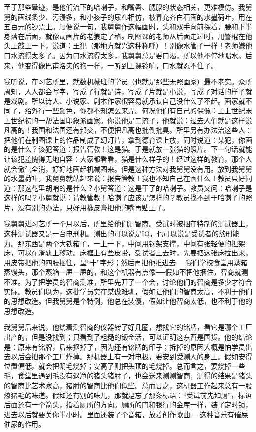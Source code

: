 至于那些晕迹，是他们流下的哈喇子，和嘴唇、腮腺的状态相关，更难模仿。我舅舅的画线条少、污渍多，和小孩子的尿布相仿，被冒充齐白石画的水墨荷叶，用在五百元的钞票上。顺便说一句，我舅舅作这幅画时，头和双手向前探着，腰和下半身落在后面，就像动画片的老狼定了格。制图课的老师从后面走过时，用警棍在他头上敲上一下，说道：王犯（那地方就兴这种称呼）！别像水管子一样！老师嫌他口水流得太多了。因为口水流得太多，我舅舅总是要口渴，所以他不停地喝水。后来，他变得像巴甫洛夫的狗一样，一听到上课铃响，口水就忍不住了。 

我听说，在习艺所里，就数机械班的学员（也就是那些无照画家）最不老实。众所周知，人人都会写字，写成了行就是诗，写成了片就是小说，写成了对话的样子就是戏剧。所以诗人、小说家、剧本作家很容易就承认自己没什么了不起。画家就不同了，给外行一些颜色，你都不知怎么来弄。何况他们有自己的偶像：上上世纪末上世纪初的一帮法国印象派画家。你说他是二流子，他就说：过去人们就是这样说凡高的！我国和法国还有邦交，不便把凡高也批倒批臭。所里另有办法治这些人：把他们在制图课上的作品制成了幻灯片，拿到德育课上放，同时说道：某犯，你画的是什么？该犯答道：报告管教！这是猫。于是就放一张猫的照片。下一句话就能让该犯羞愧得无地自容：大家都看看，猫是什么样子的！经过这样的教育，那个人就会傲气全消，好好地画起机械图来。但是这种方法对我舅舅没有用。放到我舅舅的水墨荷叶，我舅舅就站起来说：报告管教！我也不知自己在画什么！教员只好问道：那这花里胡哨的是什么？小舅答道：这是干了的哈喇子。教员又问：哈喇子是这样的吗？小舅就说：请教管教！哈喇子应该是怎样的？教员找不到干哈喇子的照片，没有别的办法，只好用橡皮膏把他的嘴再贴上了。 

我舅舅进习艺所一个月以后，所里给他们测智商。受试时被捆在特制的测试器上，这种测试器又是一台电刑机。测出的可以说是IQ，也可以说是受试者的熬刑能力。那东西是两个大铁箱子，一上一下，中间用钢架支撑，中间有张轻便的担架床，可以在滑轨上移动。床框上有些皮带，受试者上去时，先要把这张床拉出来，用皮带把他的四肢捆住，呈“十”字形；然后再把他推进去──我们学校食堂用蒸箱蒸馒头，那个蒸箱一屉一屉的，和这个机器有点像──假如不把他捆住，智商就测不准。为了把学员的智商测准，所里先开了一个会，讨论他们的智商是多少才符合实际。教员们以为，这批学员实在桀傲难驯，假如让他们的智商太高，不利于他们的思想改造。但我舅舅是个特例，他总在装傻，假如让他智商太低，也不利于他的思想改造。 

我舅舅后来说，他绕着测智商的仪器转了好几圈，想找它的铭牌，看它是哪个工厂出产的，但是没找到；只看到了粗糙的钣金活，可以证明这东西是国货。他的结论是：原来有铭牌，后来抠掉了，因为还有铭牌的印子；拆掉的原因大概是怕学员出去以后会把那个工厂炸掉。那机器上有一对电极，要安到受测人的身上。假如安得位置偏低，就会把阴毛烧掉；安高了则把头顶的毛烧掉。总而言之，要烧掉一些毛，食堂里遇到毛没有退净的猪头猪肘子，也会送来测测智商，测得的结果是猪头的智商比艺术家高，猪肘的智商比他们低些。总而言之，这机器工作起来总有一股燎猪毛的味道。假如还有别的味儿，那就是忘了那条标语：“受试前先如厕”，标语后面还有一个箭头，指着厕所的方向。厕所的门和银行的金库一样，装了定时锁，进去以后就要关你半小时。里面还装了个音箱，放着创作歌曲──这种音乐有催屎催尿的作用。 

